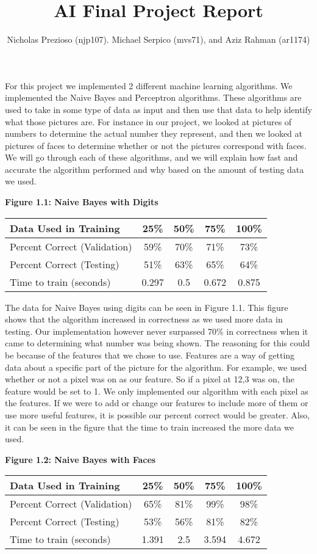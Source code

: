 \documentclass[11pt]{article} %
\title{AI Final Project Report}
\author{Nicholas Prezioso (njp107). Michael Serpico (mvs71), and Aziz Rahman (ar1174)}
\begin{document}
\maketitle

For this project we implemented 2 different machine learning algorithms. We implemented the Naive Bayes and Perceptron algorithms. These algorithms are used to take in some type of data as input and then use that data to help identify what those pictures are. For instance in our project, we looked at pictures of numbers to determine the actual number they represent, and then we looked at pictures of faces to determine whether or not the pictures correspond with faces. We will go through each of these algorithms, and we will explain how fast and accurate the algorithm performed and why based on the amount of testing data we used.\\
\begin{center}
\textbf{Figure 1.1: Naive Bayes with Digits}
\begin{tabular}{| l | c | c | c | c |}
\hline
Data Used in Training & 25\% & 50\% & 75\% & 100\%\\ \hline
Percent Correct (Validation) & 59\% & 70\% & 71\% & 73\%\\
Percent Correct (Testing) & 51\% & 63\% & 65\% & 64\%\\
Time to train (seconds) & 0.297 & 0.5 & 0.672 & 0.875\\
\hline
\end{tabular}
\end{center}
\par
The data for Naive Bayes using digits can be seen in Figure 1.1. This figure shows that the algorithm increased in correctness as we used more data in testing. Our implementation however never surpassed 70\% in correctness when it came to determining what number was being shown. The reasoning for this could be because of the features that we chose to use. Features are a way of getting data about a specific part of the picture for the algorithm. For example, we used whether or not a pixel was on as our feature. So if a pixel at 12,3 was on, the feature would be set to 1. We only implemented our algorithm with each pixel as the features. If we were to add  or change our features to include more of them or use more useful features, it is possible our percent correct would be greater. Also, it can be seen in the figure that the time to train increased the more data we used.\newpage
\begin{center}
\textbf{Figure 1.2: Naive Bayes with Faces}
\begin{tabular}{| l | c | c | c | c |}
\hline
Data Used in Training & 25\% & 50\% & 75\% & 100\%\\ \hline
Percent Correct (Validation) & 65\% & 81\% & 99\% & 98\%\\
Percent Correct (Testing) & 53\% & 56\% & 81\% & 82\%\\
Time to train (seconds) & 1.391 & 2.5 & 3.594 & 4.672\\
\hline
\end{tabular}
\end{center}
\end{document}
